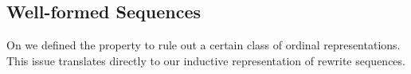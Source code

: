

\subsection{Well-formed Sequences}\label{sub:wf}

On  we defined the
 property to rule out a certain
class of ordinal representations. This issue translates directly to our
inductive representation of rewrite sequences.
